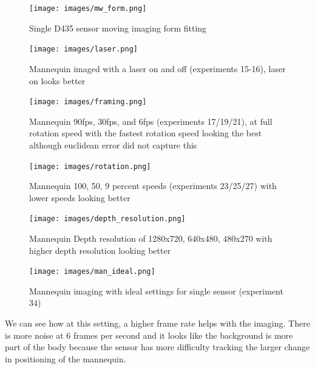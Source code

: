 \begin{figure}[!htb]
	\caption{Single D435 sensor moving imaging form fitting}
	\centering
	\texttt{[image: images/mw\_form.png]}
\end{figure}


\begin{figure}[!htb]
	\caption{Mannequin imaged with a laser on and off (experiments 15-16), laser on looks better}
	\centering
	\texttt{[image: images/laser.png]}
\end{figure}


\begin{figure}[!htb]
	\caption{Mannequin 90fps, 30fps, and 6fps (experiments 17/19/21), at full rotation speed with the fastest rotation speed looking the best although euclidean error did not capture this}
	\centering
	\texttt{[image: images/framing.png]}
\end{figure}


\begin{figure}[!htb]
	\caption{Mannequin 100, 50, 9 percent speeds (experiments 23/25/27)  with lower speeds looking better}
	\centering
	\texttt{[image: images/rotation.png]}
\end{figure}

\begin{figure}[!htb]
	\caption{Mannequin Depth resolution of 1280x720, 640x480, 480x270 with higher depth resolution looking better}
	\centering
	\texttt{[image: images/depth\_resolution.png]}
\end{figure}

\begin{figure}[!htb]
	\caption{Mannequin imaging with ideal settings for single sensor (experiment 34)}
	\centering
	\texttt{[image: images/man\_ideal.png]}
\end{figure}



We can see how at this setting, a higher frame rate helps with the imaging. There is more noise at 6 frames per second and it looks like the background is more part of the body because the sensor has more difficulty tracking the larger change in positioning of the mannequin.

